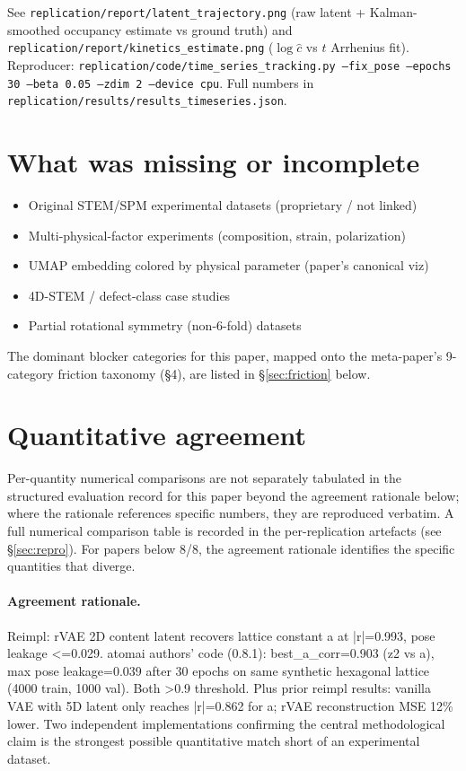 \documentclass[11pt]{article}
\begin{document}
\noindent See \texttt{replication/report/latent\_trajectory.png} (raw latent +
Kalman-smoothed occupancy estimate vs ground truth) and
\texttt{replication/report/kinetics\_estimate.png}
($\log\hat c$ vs $t$ Arrhenius fit).
Reproducer: \texttt{replication/code/time\_series\_tracking.py --fix\_pose
--epochs 30 --beta 0.05 --zdim 2 --device cpu}.
Full numbers in \texttt{replication/results/results\_timeseries.json}.

\section{What was missing or incomplete}
\begin{itemize}
\item Original STEM/SPM experimental datasets (proprietary / not linked)
\item Multi-physical-factor experiments (composition, strain, polarization)
\item UMAP embedding colored by physical parameter (paper's canonical viz)
\item 4D-STEM / defect-class case studies
\item Partial rotational symmetry (non-6-fold) datasets
\end{itemize}
The dominant blocker categories for this paper, mapped onto the meta-paper's 9-category friction taxonomy (\S4), are listed in \S\ref{sec:friction} below.

\section{Quantitative agreement}
Per-quantity numerical comparisons are not separately tabulated in the structured evaluation record for this paper beyond the agreement rationale below; where the rationale references specific numbers, they are reproduced verbatim. A full numerical comparison table is recorded in the per-replication artefacts (see \S\ref{sec:repro}). For papers below 8/8, the agreement rationale identifies the specific quantities that diverge.

\paragraph{Agreement rationale.} Reimpl: rVAE 2D content latent recovers lattice constant a at |r|=0.993, pose leakage \textless{}=0.029. atomai authors' code (0.8.1): best\_a\_corr=0.903 (z2 vs a), max pose leakage=0.039 after 30 epochs on same synthetic hexagonal lattice (4000 train, 1000 val). Both \textgreater{}0.9 threshold. Plus prior reimpl results: vanilla VAE with 5D latent only reaches |r|=0.862 for a; rVAE reconstruction MSE 12\% lower. Two independent implementations confirming the central methodological claim is the strongest possible quantitative match short of an experimental dataset.
\end{document}
